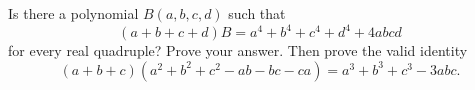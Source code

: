 Is there a polynomial $B(a,b,c,d)$ such that
\[
(a+b+c+d)B=a^4+b^4+c^4+d^4+4abcd
\]
for every real quadruple? Prove your answer. Then prove the valid identity
\[
(a+b+c)(a^2+b^2+c^2-ab-bc-ca)=a^3+b^3+c^3-3abc.
\]
